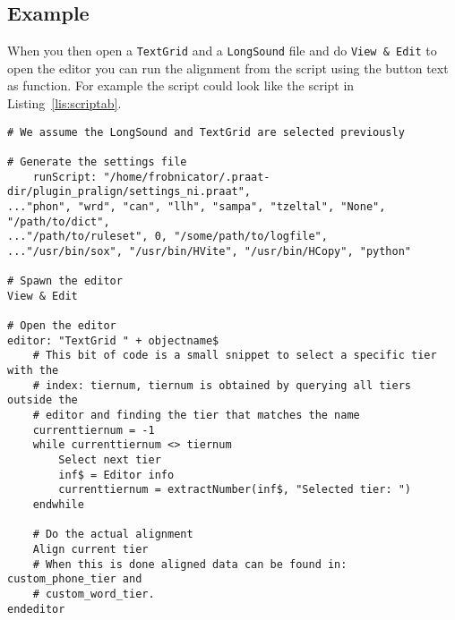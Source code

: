 \subsection{Example}
When you then open a \texttt{TextGrid} and a \texttt{LongSound} file and do
\texttt{View \& Edit} to open the editor you can run the alignment from the
script using the button text as function. For example the script could look
like the script in Listing~\ref{lis:scriptab}.

\begin{lstlisting}[caption={Example scriptability},label={lis:scriptab}]
# We assume the LongSound and TextGrid are selected previously

# Generate the settings file
	runScript: "/home/frobnicator/.praat-dir/plugin_pralign/settings_ni.praat",
..."phon", "wrd", "can", "llh", "sampa", "tzeltal", "None", "/path/to/dict",
..."/path/to/ruleset", 0, "/some/path/to/logfile",
..."/usr/bin/sox", "/usr/bin/HVite", "/usr/bin/HCopy", "python"

# Spawn the editor
View & Edit

# Open the editor
editor: "TextGrid " + objectname$
	# This bit of code is a small snippet to select a specific tier with the
	# index: tiernum, tiernum is obtained by querying all tiers outside the
	# editor and finding the tier that matches the name
	currenttiernum = -1
	while currenttiernum <> tiernum
		Select next tier
		inf$ = Editor info
		currenttiernum = extractNumber(inf$, "Selected tier: ")
	endwhile
	
	# Do the actual alignment
	Align current tier
	# When this is done aligned data can be found in: custom_phone_tier and 
	# custom_word_tier.
endeditor
\end{lstlisting}

